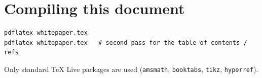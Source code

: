 \documentclass[11pt,a4paper]{article}
\newcommand{\code}[1]{\texttt{#1}}
\begin{document}
\section*{Compiling this document}

\begin{verbatim}
pdflatex whitepaper.tex
pdflatex whitepaper.tex   # second pass for the table of contents / refs
\end{verbatim}
\noindent
Only standard TeX Live packages are used (\code{amsmath}, \code{booktabs},
\code{tikz}, \code{hyperref}).
\end{document}
